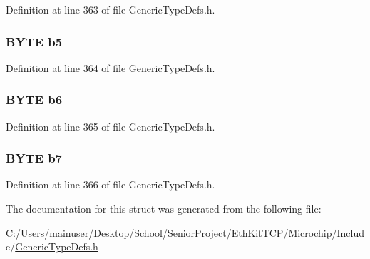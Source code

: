 Definition at line 363 of file Generic\+Type\+Defs.\+h.

\hypertarget{struct_b_y_t_e___v_a_l_1_1_____p_a_c_k_e_d_a5bc6d9bf38897a03e8cfaff1bf671262}{}
\subsubsection[{b5}]{ {\bf B\+Y\+T\+E} b5}\label{struct_b_y_t_e___v_a_l_1_1_____p_a_c_k_e_d_a5bc6d9bf38897a03e8cfaff1bf671262}


Definition at line 364 of file Generic\+Type\+Defs.\+h.

\hypertarget{struct_b_y_t_e___v_a_l_1_1_____p_a_c_k_e_d_a08c152641a8bd5ff9d0f779e362a11d9}{}
\subsubsection[{b6}]{ {\bf B\+Y\+T\+E} b6}\label{struct_b_y_t_e___v_a_l_1_1_____p_a_c_k_e_d_a08c152641a8bd5ff9d0f779e362a11d9}


Definition at line 365 of file Generic\+Type\+Defs.\+h.

\hypertarget{struct_b_y_t_e___v_a_l_1_1_____p_a_c_k_e_d_ac7cbdf5792b6143a65ed5a12ace2199e}{}
\subsubsection[{b7}]{ {\bf B\+Y\+T\+E} b7}\label{struct_b_y_t_e___v_a_l_1_1_____p_a_c_k_e_d_ac7cbdf5792b6143a65ed5a12ace2199e}


Definition at line 366 of file Generic\+Type\+Defs.\+h.



The documentation for this struct was generated from the following file\+:\begin{DoxyCompactItemize}
\item 
C\+:/\+Users/mainuser/\+Desktop/\+School/\+Senior\+Project/\+Eth\+Kit\+T\+C\+P/\+Microchip/\+Include/\hyperlink{_generic_type_defs_8h}{Generic\+Type\+Defs.\+h}\end{DoxyCompactItemize}
